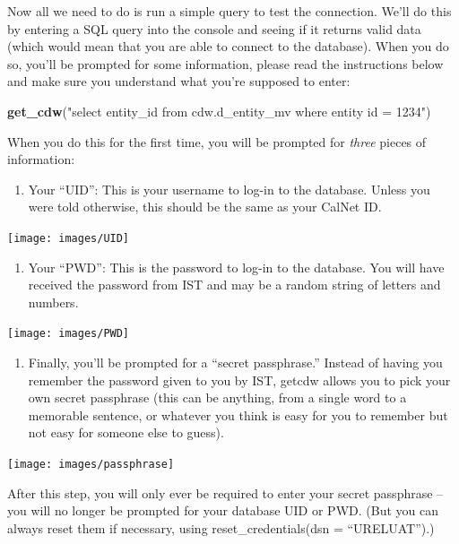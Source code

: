 \documentclass[]{book}
\newenvironment{Shaded}{\begin{snugshade}}{\end{snugshade}}
\newcommand{\KeywordTok}[1]{\textcolor[rgb]{0.13,0.29,0.53}{\textbf{#1}}}
\newcommand{\NormalTok}[1]{#1}
\newcommand{\StringTok}[1]{\textcolor[rgb]{0.31,0.60,0.02}{#1}}
\providecommand{\tightlist}{%
  \setlength{\itemsep}{0pt}\setlength{\parskip}{0pt}}
\begin{document}
Now all we need to do is run a simple query to test the connection. We'll do this by entering a SQL query into the console and seeing if it returns valid data (which would mean that you are able to connect to the database). When you do so, you'll be prompted for some information, please read the instructions below and make sure you understand what you're supposed to enter:

\begin{Shaded}
\begin{Highlighting}[]
\KeywordTok{get_cdw}\NormalTok{(}\StringTok{"select entity_id from cdw.d_entity_mv where entity id = 1234"}\NormalTok{)}
\end{Highlighting}
\end{Shaded}

When you do this for the first time, you will be prompted for \emph{three} pieces of information:

\begin{enumerate}
\def\labelenumi{\arabic{enumi})}
\tightlist
\item
  Your ``UID'': This is your username to log-in to the database. Unless you were told otherwise, this should be the same as your CalNet ID.
\end{enumerate}

\texttt{[image: images/UID]}

\begin{enumerate}
\def\labelenumi{\arabic{enumi})}
\setcounter{enumi}{1}
\tightlist
\item
  Your ``PWD'': This is the password to log-in to the database. You will have received the password from IST and may be a random string of letters and numbers.
\end{enumerate}

\texttt{[image: images/PWD]}

\begin{enumerate}
\def\labelenumi{\arabic{enumi})}
\setcounter{enumi}{2}
\tightlist
\item
  Finally, you'll be prompted for a ``secret passphrase.'' Instead of having you remember the password given to you by IST, getcdw allows you to pick your own secret passphrase (this can be anything, from a single word to a memorable sentence, or whatever you think is easy for you to remember but not easy for someone else to guess).
\end{enumerate}

\texttt{[image: images/passphrase]}

After this step, you will only ever be required to enter your secret passphrase -- you will no longer be prompted for your database UID or PWD. (But you can always reset them if necessary, using reset\_credentials(dsn = ``URELUAT'').)
\end{document}
